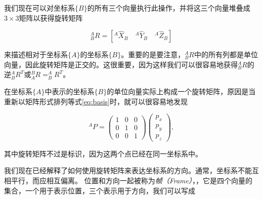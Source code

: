我们现在可以对坐标系$\{B\}$的所有三个向量执行此操作，并将这三个向量堆叠成$3\times3$矩阵以获得旋转矩阵

%
\begin{equation}
^A_BR=[^A\hat{X}_B \quad ^A\hat{Y}_B \quad ^A\hat{Z}_B]
\end{equation}
%

来描述相对于坐标系$\{A\}$的坐标系$\{B\}$。重要的是要注意，$^A_BR$中的所有列都是单位向量，因此旋转矩阵是正交的。这很重要，因为这样我们可以很容易地获得$^A_BR$的逆$^A_BR^T$或$^B_AR=^A_BR^T$。


在坐标系$\{A\}$中表示的坐标系$\{B\}$的单位向量实际上构成一个旋转矩阵，原因是当重新以矩阵形式排列等式\ref{eq:basis}时，就可以很容易地发现

\begin{equation}
^AP=\left(\begin{array}{ccc}1 & 0 & 0\\0 & 1 & 0\\0 & 0 & 1\end{array}\right)\left(\begin{array}{c}p_x\\p_y\\p_z\end{array}\right),
\end{equation}


其中旋转矩阵不过是标识，因为这两个点已经在同一坐标系中。

%

我们现在已经解释了如何使用旋转矩阵来表达坐标系的方向。通常，坐标系不能互相平行，而应相互偏离。 位置和方向一起被称为\emph{帧（Frame）}，，它是四个向量的集合，一个用于表示位置，三个表示用于方向，我们可以写成

